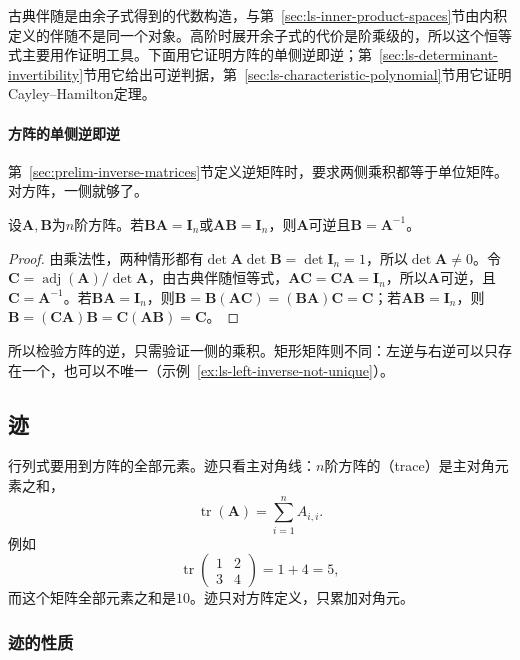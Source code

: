 古典伴随是由余子式得到的代数构造，与第~\ref{sec:ls-inner-product-spaces}节由内积定义的伴随不是同一个对象。高阶时展开余子式的代价是阶乘级的，所以这个恒等式主要用作证明工具。下面用它证明方阵的单侧逆即逆；第~\ref{sec:ls-determinant-invertibility}节用它给出可逆判据，第~\ref{sec:ls-characteristic-polynomial}节用它证明Cayley--Hamilton定理。

\paragraph{方阵的单侧逆即逆}
\label{sec:ls-square-one-sided-inverse}
第~\ref{sec:prelim-inverse-matrices}节定义逆矩阵时，要求两侧乘积都等于单位矩阵。对方阵，一侧就够了。
\begin{theorem}[方阵的单侧逆即逆]
\label{thm:ls-square-one-sided-inverse}
设$\bm A,\bm B$为$n$阶方阵。若$\bm B\bm A=\bm I_n$或$\bm A\bm B=\bm I_n$，则$\bm A$可逆且$\bm B=\bm A^{-1}$。
\end{theorem}
\begin{proof}
由乘法性，两种情形都有$\det\bm A\det\bm B=\det\bm I_n=1$，所以$\det\bm A\neq0$。令$\bm C=\operatorname{adj}(\bm A)/\det\bm A$，由古典伴随恒等式，$\bm A\bm C=\bm C\bm A=\bm I_n$，所以$\bm A$可逆，且$\bm C=\bm A^{-1}$。若$\bm B\bm A=\bm I_n$，则$\bm B=\bm B(\bm A\bm C)=(\bm B\bm A)\bm C=\bm C$；若$\bm A\bm B=\bm I_n$，则$\bm B=(\bm C\bm A)\bm B=\bm C(\bm A\bm B)=\bm C$。
\end{proof}
所以检验方阵的逆，只需验证一侧的乘积。矩形矩阵则不同：左逆与右逆可以只存在一个，也可以不唯一（示例~\ref{ex:ls-left-inverse-not-unique}）。

\subsection{迹}
\label{sec:prelim-matrix-trace}

行列式要用到方阵的全部元素。迹只看主对角线：$n$阶方阵的（trace）是主对角元素之和，
\[
 \operatorname{tr}(\bm A)=\sum_{i=1}^n A_{i,i}.
\]
例如
\[
 \operatorname{tr}\begin{pmatrix}1&2\\3&4\end{pmatrix}=1+4=5,
\]
而这个矩阵全部元素之和是$10$。迹只对方阵定义，只累加对角元。

\subsubsection{迹的性质}
\label{sec:ls-matrix-contractions}

